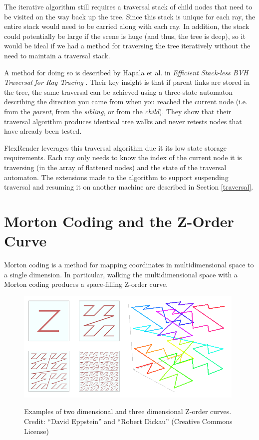 \documentclass[12pt]{ucthesis}
\newcommand{\captionfonts}{\small\bf\ssp}
\begin{document}
The iterative algorithm still requires a traversal stack of child nodes that
need to be visited on the way back up the tree. Since this stack is unique for
each ray, the entire stack would need to be carried along with each ray. In
addition, the stack could potentially be large if the scene is huge (and thus,
the tree is deep), so it would be ideal if we had a method for traversing the
tree iteratively without the need to maintain a traversal stack.

A method for doing so is described by Hapala et al. in
\emph{Efficient Stack-less BVH Traversal for Ray Tracing} \cite{hapala:2011}.
Their key insight is that if parent links are stored in the tree, the same
traversal can be achieved using a three-state automaton describing the direction
you came from when you reached the current node (i.e. from the \emph{parent},
from the \emph{sibling}, or from the \emph{child}). They show that their
traversal algorithm produces identical tree walks and never retests nodes that
have already been tested.

FlexRender leverages this traversal algorithm due it its low state storage
requirements. Each ray only needs to know the index of the current node it is
traversing (in the array of flattened nodes) and the state of the traversal
automaton. The extensions made to the algorithm to support suspending traversal
and resuming it on another machine are described in Section \ref{traversal}.

\section{Morton Coding and the Z-Order Curve}
\label{morton}

Morton coding is a method for mapping coordinates in multidimensional space to
a single dimension. In particular, walking the multidimensional space with a
Morton coding produces a space-filling Z-order curve.

\begin{figure}[h!]
    \centering
    \includegraphics[width=110mm]{figures/zorder.png}
    \captionfonts
    \caption{Examples of two dimensional and three dimensional Z-order curves. Credit: ``David Eppstein'' and ``Robert Dickau'' (Creative Commons License)}
    \label{fig:zorder}
\end{figure}
\end{document}
